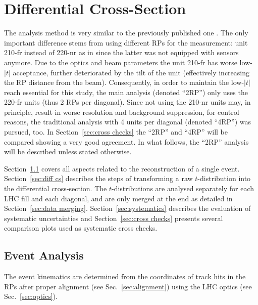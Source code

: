 \section{Differential Cross-Section}
\label{sec:differential cross-section}

The analysis method is very similar to the previously published one \cite{totem-8tev-1km}. The only important difference stems from using different RPs for the measurement: unit 210-fr instead of 220-nr as in \cite{totem-8tev-1km} since the latter was not equipped with sensors anymore. Due to the optics and beam parameters the unit 210-fr has worse low-$|t|$ acceptance, further deteriorated by the tilt of the unit (effectively increasing the RP distance from the beam). Consequently, in order to maintain the low-$|t|$ reach essential for this study, the main analysis (denoted ``2RP'') only uses the 220-fr units (thus 2 RPs per diagonal). Since not using the 210-nr units may, in principle, result in worse resolution and background suppression, for control reasons, the traditional analysis with 4 units per diagonal (denoted ``4RP'') was pursued, too. In Section~\ref{sec:cross checks} the ``2RP'' and ``4RP'' will be compared showing a very good agreement. In what follows, the ``2RP'' analysis will be described unless stated otherwise.

Section~\ref{sec:event analysis} covers all aspects related to the reconstruction of a single event. Section~\ref{sec:diff cs} describes the steps of transforming a raw $t$-distribution into the differential cross-section. The $t$-distributions are analysed separately for each LHC fill and each diagonal, and are only merged at the end as detailed in Section~\ref{sec:data merging}. Section~\ref{sec:systematics} describes the evaluation of systematic uncertainties and Section~\ref{sec:cross checks} presents several comparison plots used as systematic cross checks.

\subsection{Event Analysis}
\label{sec:event analysis}

The event kinematics are determined from the coordinates of track hits in the RPs after proper alignment (see Sec.~\ref{sec:alignment}) using the LHC optics (see Sec.~\ref{sec:optics}).


